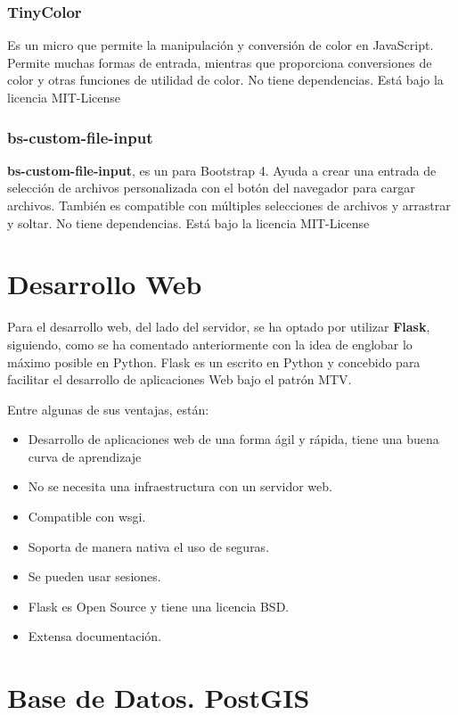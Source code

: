 \subsubsection{TinyColor}

Es un micro  que permite la manipulación y conversión de color en JavaScript. Permite muchas formas de entrada, mientras que proporciona conversiones de color y otras funciones de utilidad de color. No tiene dependencias. Está bajo la licencia MIT-License


\subsubsection{bs-custom-file-input}

\textbf{bs-custom-file-input}, es un  para Bootstrap 4. Ayuda a crear una entrada de selección de archivos personalizada con el botón del navegador para cargar archivos. También es compatible con múltiples selecciones de archivos y arrastrar y soltar.
No tiene dependencias. Está bajo la licencia MIT-License

\section{Desarrollo Web}

Para el desarrollo web, del lado del servidor, se ha optado por utilizar \textbf{Flask}, siguiendo, como se ha comentado anteriormente con la idea de englobar lo máximo posible en Python.
Flask es un  escrito en Python y concebido para facilitar el desarrollo de aplicaciones Web bajo el patrón MTV.

Entre algunas de sus ventajas, están:
\begin{itemize}
\item Desarrollo de aplicaciones web de una forma ágil y rápida, tiene una buena curva de aprendizaje
\item No se necesita una infraestructura con un servidor web.
\item Compatible con wsgi.
\item Soporta de manera nativa el uso de  seguras.
\item Se pueden usar sesiones.
\item Flask es Open Source y tiene una licencia BSD.
\item Extensa documentación.
\end{itemize}

\section{Base de Datos. PostGIS}\label{sec:postgis}

